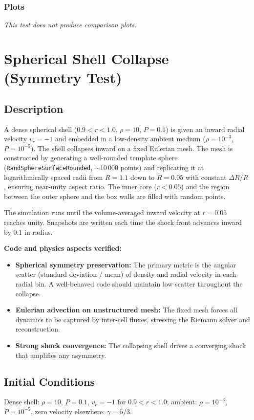\documentclass[11pt,a4paper]{article}
\begin{document}
\subsubsection*{Plots}
\textit{This test does not produce comparison plots.}

\newpage

\section{Spherical Shell Collapse (Symmetry Test)}
\label{sec:spherical_collapse}

\subsection*{Description}
A dense spherical shell ($0.9 < r < 1.0$, $\rho=10$, $P=0.1$) is given an inward radial velocity $v_r = -1$ and embedded in a low-density ambient medium ($\rho=10^{-3}$, $P=10^{-5}$).  The shell collapses inward on a fixed Eulerian mesh. The mesh is constructed by generating a well-rounded template sphere (\texttt{RandSphereSurfaceRounded}, $\sim$10\,000 points) and replicating it at logarithmically spaced radii from $R=1.1$ down to $R=0.05$ with constant $\Delta R/R$, ensuring near-unity aspect ratio. The inner core ($r<0.05$) and the region between the outer sphere and the box walls are filled with random points.

The simulation runs until the volume-averaged inward velocity at $r=0.05$ reaches unity. Snapshots are written each time the shock front advances inward by $0.1$ in radius.

\textbf{Code and physics aspects verified:}
\begin{itemize}
  \item \textbf{Spherical symmetry preservation:} The primary metric is the angular scatter (standard deviation / mean) of density and radial velocity in each radial bin. A well-behaved code should maintain low scatter throughout the collapse.
  \item \textbf{Eulerian advection on unstructured mesh:} The fixed mesh forces all dynamics to be captured by inter-cell fluxes, stressing the Riemann solver and reconstruction.
  \item \textbf{Strong shock convergence:} The collapsing shell drives a converging shock that amplifies any asymmetry.
\end{itemize}

\subsection*{Initial Conditions}
Dense shell: $\rho = 10$, $P = 0.1$, $v_r = -1$ for $0.9 < r < 1.0$; ambient: $\rho = 10^{-3}$, $P = 10^{-5}$, zero velocity elsewhere. $\gamma = 5/3$.
\end{document}
